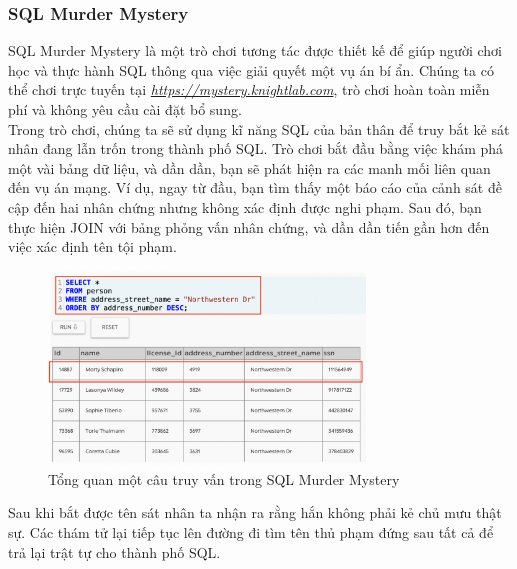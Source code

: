 \subsubsection{SQL Murder Mystery}
\hspace*{0.5cm} SQL Murder Mystery là một trò chơi tương tác được thiết kế để giúp người chơi học và thực hành SQL thông qua việc giải quyết một vụ án bí ẩn. Chúng ta có thể chơi trực tuyến tại \textit{\def\UrlFont{\bfseries}\url{https://mystery.knightlab.com}}, trò chơi hoàn toàn miễn phí và không yêu cầu cài đặt bổ sung.\\
\hspace*{0.5cm} Trong trò chơi, chúng ta sẽ sử dụng kĩ năng SQL của bản thân để truy bắt kẻ sát nhân đang lẫn trốn trong thành phố SQL. Trò chơi bắt đầu bằng việc khám phá một vài bảng dữ liệu, và dần dần, bạn sẽ phát hiện ra các manh mối liên quan đến vụ án mạng. Ví dụ, ngay từ đầu, bạn tìm thấy một báo cáo của cảnh sát đề cập đến hai nhân chứng nhưng không xác định được nghi phạm. Sau đó, bạn thực hiện JOIN với bảng phỏng vấn nhân chứng, và dần dần tiến gần hơn đến việc xác định tên tội phạm.
\begin{figure}[H]
	\centering
	\includegraphics[width=0.75\textwidth]{Images/smm_play.png}
	\vspace{0.5cm}
	\caption{Tổng quan một câu truy vấn trong SQL Murder Mystery}
\end{figure}
\hspace*{0.5cm} Sau khi bắt được tên sát nhân ta nhận ra rằng hắn không phải kẻ chủ mưu thật sự. Các thám tử lại tiếp tục lên đường đi tìm tên thủ phạm đứng sau tất cả để trả lại trật tự cho thành phố SQL.
